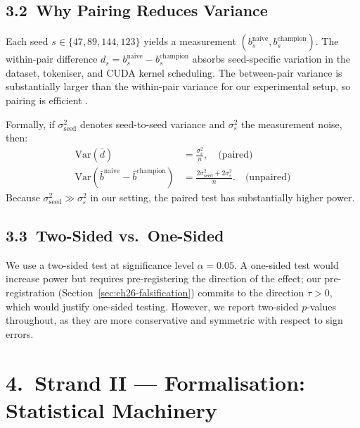 \subsection{3.2\ Why Pairing Reduces Variance}

Each seed \(s \in \{47, 89, 144, 123\}\) yields a measurement
\((b_s^{\text{naive}}, b_s^{\text{champion}})\).
The within-pair difference \(d_s = b_s^{\text{naive}} - b_s^{\text{champion}}\)
absorbs seed-specific variation in the dataset, tokeniser, and CUDA kernel
scheduling.  The between-pair variance is substantially larger than the
within-pair variance for our experimental setup, so pairing is efficient
\cite{wasserman2004statistics}.

Formally, if \(\sigma_{\text{seed}}^2\) denotes seed-to-seed variance and
\(\sigma_{\varepsilon}^2\) the measurement noise, then:
\begin{align}
  \mathrm{Var}(\bar{d}) &= \frac{\sigma_\varepsilon^2}{n},
  \quad \text{(paired)} \\
  \mathrm{Var}(\bar{b}^{\text{naive}} - \bar{b}^{\text{champion}})
    &= \frac{2\sigma_{\text{seed}}^2 + 2\sigma_\varepsilon^2}{n}.
  \quad \text{(unpaired)}
\end{align}
Because \(\sigma_{\text{seed}}^2 \gg \sigma_\varepsilon^2\) in our
setting, the paired test has substantially higher power.

\subsection{3.3\ Two-Sided vs.\ One-Sided}

We use a two-sided test at significance level \(\alpha = 0.05\).
A one-sided test would increase power but requires pre-registering the
direction of the effect; our pre-registration (Section~\ref{sec:ch26-falsification})
commits to the direction \(\tau > 0\), which would justify one-sided testing.
However, we report two-sided \(p\)-values throughout, as they are more
conservative and symmetric with respect to sign errors.

\section{4.\ Strand II --- Formalisation: Statistical Machinery}
\label{sec:ch26-strand-ii}

